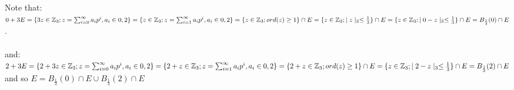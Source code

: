 Note that:\newline $0 + 3E = \{3z \in \mathbb{Z}_3; z = \sum_{i=0}^\infty a_ip^i, a_i \in {0,2}\} =\\
\{z \in \mathbb{Z}_3; z = \sum_{i=1}^\infty a_ip^i, a_i \in {0,2}\} =\\
\{z \in \mathbb{Z}_3; ord(z) \geq 1 \} \cap E=\\
\{z \in \mathbb{Z}_3; \mid z \mid_3 \leq \frac{1}{3}\} \cap E = \\
\{z \in \mathbb{Z}_3; \mid 0- z \mid_3 \leq \frac{1}{3}\} \cap E = B_{\frac{1}{3}}(0) \cap E$.
\\\\and:\\ 
$2 + 3E = \{2 + 3z \in \mathbb{Z}_3; z = \sum_{i=0}^\infty a_ip^i, a_i \in {0,2}\} =\\
\{2 + z \in \mathbb{Z}_3; z = \sum_{i=1}^\infty a_ip^i, a_i \in {0,2}\} =\\
\{2 + z \in \mathbb{Z}_3; ord(z) \geq 1 \} \cap E=\\
\{z \in \mathbb{Z}_3; \mid 2 - z \mid_3 \leq \frac{1}{3}\} \cap E = \\
B_{\frac{1}{3}}(2) \cap E$
\\ and so $E = B_{\frac{1}{3}}(0)\cap E \cup B_{\frac{1}{3}}(2) \cap E$


